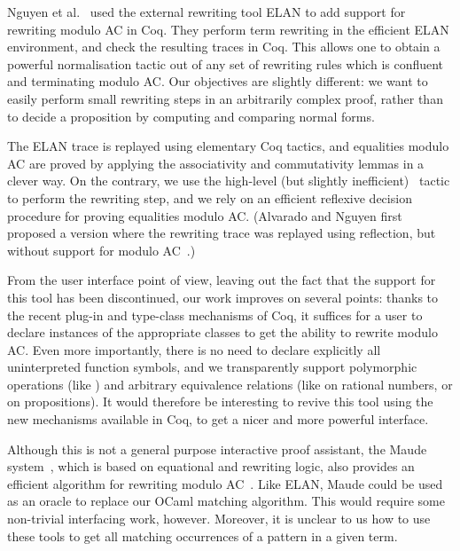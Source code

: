 \documentclass{llncs}
\begin{document}
\smallskip

Nguyen et al.~\cite{nguyen-kirchner-kirchner-02} used the external
rewriting tool ELAN to add support for rewriting modulo AC in
Coq. They perform term rewriting in the efficient ELAN environment,
and check the resulting traces in Coq. This allows one to obtain a
powerful normalisation tactic out of any set of rewriting rules which
is confluent and terminating modulo AC. Our objectives are slightly
different: we want to easily perform small rewriting steps in an
arbitrarily complex proof, rather than to decide a proposition by
computing and comparing normal forms.

The ELAN trace is replayed using elementary Coq tactics, and
equalities modulo AC are proved by applying the associativity and
commutativity lemmas in a clever way. On the contrary, we use the
high-level (but slightly inefficient) \rewrite\ tactic to perform the
rewriting step, and we rely on an efficient reflexive decision
procedure for proving equalities modulo AC. (Alvarado and Nguyen first
proposed a version where the rewriting trace was replayed using
reflection, but without support for modulo AC~\cite{alvarado}.)

From the user interface point of view, leaving out the fact that the
support for this tool has been discontinued, our work improves on
several points: thanks to the recent plug-in and type-class mechanisms
of Coq, it suffices for a user to declare instances of the appropriate
classes to get the ability to rewrite modulo AC. Even more
importantly, there is no need to declare explicitly all uninterpreted
function symbols, and we transparently support polymorphic operations
(like ) and arbitrary equivalence relations (like
 on rational numbers, or  on propositions).
It would therefore be interesting to revive this tool using the new
mechanisms available in Coq, to get a nicer and more powerful
interface.

\smallskip

Although this is not a general purpose interactive proof assistant,
the Maude system~\cite{maude}, which is based on equational and
rewriting logic, also provides an efficient algorithm for rewriting
modulo AC~\cite{eker-02}.
Like ELAN, Maude could be used as an oracle to replace our OCaml
matching algorithm. This would require some non-trivial interfacing
work, however. Moreover, it is unclear to us how to use these tools to
get all matching occurrences of a pattern in a given term.
\end{document}
